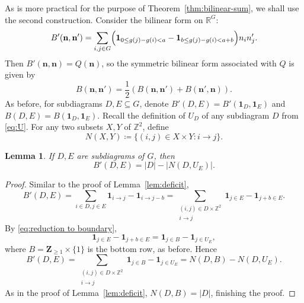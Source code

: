 \documentclass[11pt,reqno]{amsart}
\newtheorem{lemma}[theorem]{Lemma}
\theoremstyle{remark}
\begin{document}
As is more practical for the purpose of Theorem~\ref{thm:bilinear-sum}, we shall use the second construction. Consider the bilinear form on $\mathbb{R}^G$:
\[ B'(\mathbf{n},\mathbf{n'})=\sum_{i,j\in G} \Bigl(\mathbf{1}_{0\le g(j)-g(i)<a}-\mathbf{1}_{b\le g(j)-g(i)<a+b}\Bigr)n_i n'_j.\]
Then $B'(\mathbf{n},\mathbf{n})=Q(\mathbf{n})$, so the symmetric bilinear form associated with $Q$ is given by
\[ B(\mathbf{n},\mathbf{n'})=\frac{1}{2}(B(\mathbf{n},\mathbf{n'})+B(\mathbf{n'},\mathbf{n})).\]
As before, for subdiagrams $D,E\subseteq G$, denote $B'(D,E)=B'(\mathbf{1}_D,\mathbf{1}_E)$ and $B(D,E)=B(\mathbf{1}_D,\mathbf{1}_E)$. Recall the definition of $U_D$ of any subdiagram $D$ from \eqref{eq:U}. For any two subsets $X,Y$ of $\mathbb{Z}^2$, define
\[ N(X,Y)\coloneq \{(i,j)\in X\times Y:i\to j\}.\]
\begin{lemma}
    \label{lem:B'}
    If $D,E$ are subdiagrams of $G$, then
    \[ B'(D,E)=|D|-|N(D,U_E)|.\]
\end{lemma}
\begin{proof}
    Similar to the proof of Lemma~\ref{lem:deficit}, 
    \[ B'(D,E)=\sum_{i\in D, j\in E} \mathbf{1}_{i\to j}-\mathbf{1}_{i\to j-b} = \sum_{\substack{(i,j)\in D\times \mathbb{Z}^2\\i\to j}} \mathbf{1}_{j\in E}-\mathbf{1}_{j+b\in E}.\]
    By \eqref{eq:reduction to boundary}, 
    \[ \mathbf{1}_{j\in E}-\mathbf{1}_{j+b\in E} = \mathbf{1}_{j\in B}-\mathbf{1}_{j\in U_E},\]
    where $B=\mathbf{Z}_{\geq 1}\times \{1\}$ is the bottom row, as before. Hence
    \[ B'(D,E) = \sum_{\substack{(i,j)\in D\times \mathbb{Z}^2\\i\to j}}\mathbf{1}_{j\in B}-\mathbf{1}_{j\in U_E} = N(D,B)-N(D,U_E).\]
    As in the proof of Lemma~\ref{lem:deficit}, $N(D,B)=|D|$, finishing the proof.
\end{proof}
\end{document}
